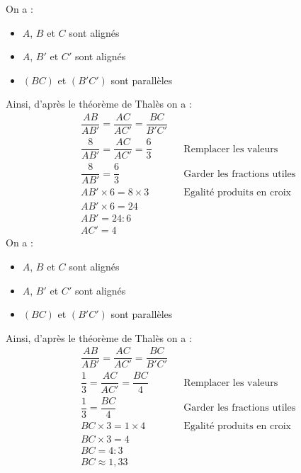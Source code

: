   \begin{multicols}{2}
    \exo{}{} On a :
    \begin{itemize}
      \item $A$, $B$ et $C$ sont alignés
      \item $A$, $B'$ et $C'$ sont alignés
      \item $(BC)$ et $(B'C')$ sont parallèles
    \end{itemize}
    Ainsi, d'après le théorème de Thalès on a :
    \begin{align*}
      &\dfrac{AB}{AB'}=\dfrac{AC}{AC'}=\dfrac{BC}{B'C'}&&\\
      &\dfrac{8}{AB'}=\dfrac{AC}{AC'}=\dfrac{6}{3}&&\text{Remplacer les valeurs}\\
      &\dfrac{8}{AB'}=\dfrac{6}{3}&&\text{Garder les fractions utiles}\\
      &AB'\times 6=8\times 3 &&\text{Egalité produits en croix}\\
      &AB'\times 6=24 &&\\
      &AB'=24:6&&\\
      &AC'=4&&
    \end{align*}
    \exo{}{} On a :
    \vspace{-1em} %
    \begin{itemize}
      \item $A$, $B$ et $C$ sont alignés
      \item $A$, $B'$ et $C'$ sont alignés
      \item $(BC)$ et $(B'C')$ sont parallèles
    \end{itemize}
    Ainsi, d'après le théorème de Thalès on a :
    \begin{align*}
      &\dfrac{AB}{AB'}=\dfrac{AC}{AC'}=\dfrac{BC}{B'C'}&&\\
      &\dfrac{1}{3}=\dfrac{AC}{AC'}=\dfrac{BC}{4}&&\text{Remplacer les valeurs}\\
      &\dfrac{1}{3}=\dfrac{BC}{4}&&\text{Garder les fractions utiles}\\
      &BC\times 3=1\times 4&&\text{Egalité produits en croix}\\
      &BC\times 3=4 &&\\
      &BC=4:3 &&\\
      &BC\approx 1,33&&
    \end{align*}
  \end{multicols}
